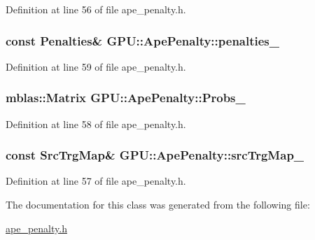 Definition at line 56 of file ape\+\_\+penalty.\+h.

\subsubsection[{\texorpdfstring{penalties\+\_\+}{penalties_}}]{\setlength{\rightskip}{0pt plus 5cm}const {\bf Penalties}\& G\+P\+U\+::\+Ape\+Penalty\+::penalties\+\_\+\hspace{0.3cm}{\ttfamily [private]}}\hypertarget{classGPU_1_1ApePenalty_aaa86c75eac67269551b29b9b12f47df8}{}\label{classGPU_1_1ApePenalty_aaa86c75eac67269551b29b9b12f47df8}


Definition at line 59 of file ape\+\_\+penalty.\+h.

\subsubsection[{\texorpdfstring{Probs\+\_\+}{Probs_}}]{\setlength{\rightskip}{0pt plus 5cm}mblas\+::\+Matrix G\+P\+U\+::\+Ape\+Penalty\+::\+Probs\+\_\+\hspace{0.3cm}{\ttfamily [private]}}\hypertarget{classGPU_1_1ApePenalty_a9f7c2134d832fe081cd86973d19bb58b}{}\label{classGPU_1_1ApePenalty_a9f7c2134d832fe081cd86973d19bb58b}


Definition at line 58 of file ape\+\_\+penalty.\+h.

\subsubsection[{\texorpdfstring{src\+Trg\+Map\+\_\+}{srcTrgMap_}}]{\setlength{\rightskip}{0pt plus 5cm}const {\bf Src\+Trg\+Map}\& G\+P\+U\+::\+Ape\+Penalty\+::src\+Trg\+Map\+\_\+\hspace{0.3cm}{\ttfamily [private]}}\hypertarget{classGPU_1_1ApePenalty_ad78cff59e0294e7e42da2ca5fedec151}{}\label{classGPU_1_1ApePenalty_ad78cff59e0294e7e42da2ca5fedec151}


Definition at line 57 of file ape\+\_\+penalty.\+h.



The documentation for this class was generated from the following file\+:\begin{DoxyCompactItemize}
\item 
\hyperlink{ape__penalty_8h}{ape\+\_\+penalty.\+h}\end{DoxyCompactItemize}
